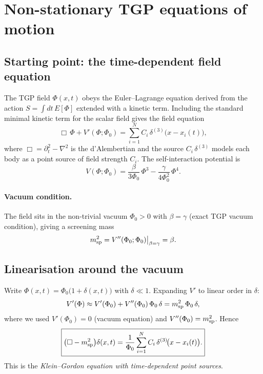 
\section{Non-stationary TGP equations of motion}

\subsection{Starting point: the time-dependent field equation}

The TGP field $\Phi(x,t)$ obeys the Euler--Lagrange equation derived from
the action $S = \int dt\, E[\Phi]$ extended with a kinetic term.
Including the standard minimal kinetic term for the scalar field gives the
field equation
\begin{equation}
\Box\,\Phi + V'(\Phi;\Phi_0)
= \sum_{i=1}^N C_i\,\delta^{(3)}\!\bigl(x - x_i(t)\bigr),
\label{eq:field_eq_full}
\end{equation}
where $\Box = \partial_t^2 - \nabla^2$ is the d'Alembertian and
the source $C_i\,\delta^{(3)}$ models each body as a point source of
field strength $C_i$.  The self-interaction potential is
\begin{equation}
V(\Phi;\Phi_0)
= \frac{\beta}{3\Phi_0}\,\Phi^3 - \frac{\gamma}{4\Phi_0^2}\,\Phi^4.
\end{equation}

\paragraph{Vacuum condition.}
The field sits in the non-trivial vacuum $\Phi_0>0$ with $\beta=\gamma$
(exact TGP vacuum condition), giving a screening mass
\begin{equation}
m_{\rm sp}^2 = V''(\Phi_0;\Phi_0)\big|_{\beta=\gamma} = \beta.
\end{equation}

\subsection{Linearisation around the vacuum}

Write $\Phi(x,t) = \Phi_0\bigl(1 + \delta(x,t)\bigr)$ with $\delta\ll 1$.
Expanding $V'$ to linear order in $\delta$:
\begin{equation}
V'(\Phi) \approx V'(\Phi_0) + V''(\Phi_0)\,\Phi_0\,\delta
= m_{\rm sp}^2\,\Phi_0\,\delta,
\end{equation}
where we used $V'(\Phi_0)=0$ (vacuum equation) and $V''(\Phi_0)=m_{\rm sp}^2$.
Hence
\begin{equation}
\boxed{
\bigl(\Box - m_{\rm sp}^2\bigr)\delta(x,t)
= \frac{1}{\Phi_0}\sum_{i=1}^N C_i\,\delta^{(3)}\!\bigl(x - x_i(t)\bigr).
}
\label{eq:wave_delta}
\end{equation}
This is the \emph{Klein--Gordon equation with time-dependent point sources}.

